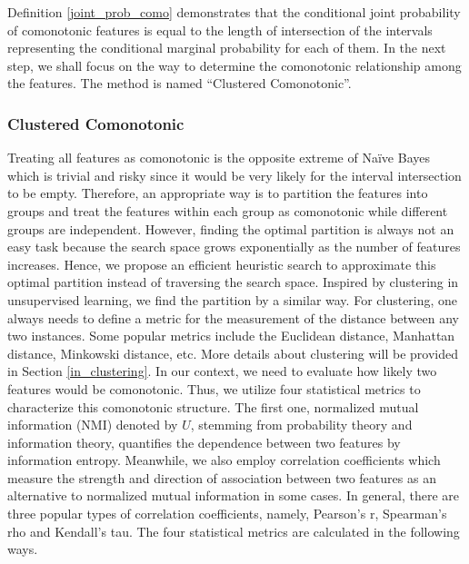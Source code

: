 \documentclass[twoside,11pt]{article}
\begin{document}
Definition \ref{joint_prob_como} demonstrates that the conditional joint probability of comonotonic features is equal to the length of intersection of the intervals representing the conditional marginal probability for each of them. In the next step, we shall focus on the way to determine the comonotonic relationship among the features. The method is named ``Clustered Comonotonic''.

\subsubsection{Clustered Comonotonic}\label{cluster_como}
Treating all features as comonotonic is the opposite extreme of Na\"ive Bayes which is trivial and risky since it would be very likely for the interval intersection to be empty. Therefore, an appropriate way is to partition the features into groups and treat the features within each group as comonotonic while different groups are independent. However, finding the optimal partition is always not an easy task because the search space grows exponentially as the number of features increases. Hence, we propose an efficient heuristic search to approximate this optimal partition instead of traversing the search space. Inspired by clustering in unsupervised learning, we find the partition by a similar way. For clustering, one always needs to define a metric for the measurement of the distance between any two instances. Some popular metrics include the Euclidean distance, Manhattan distance, Minkowski distance, etc. More details about clustering will be provided in Section \ref{in_clustering}. In our context, we need to evaluate how likely two features would be comonotonic. Thus, we utilize four statistical metrics to characterize this comonotonic structure. The first one, normalized mutual information (NMI) denoted by $U$, stemming from probability theory and information theory, quantifies the dependence between two features by information entropy. Meanwhile, we also employ correlation coefficients which measure the strength and direction of association between two features as an alternative to normalized mutual information in some cases. In general, there are three popular types of correlation coefficients, namely, Pearson's r, Spearman's rho and Kendall's tau. The four statistical metrics are calculated in the following ways.
\end{document}
